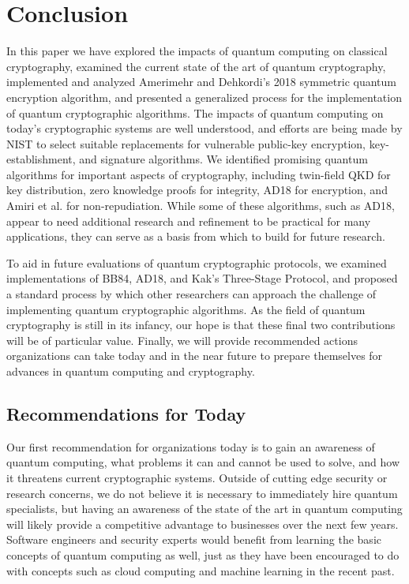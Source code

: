 \documentclass[sigconf]{acmart}
\begin{document}
\section{Conclusion}
In this paper we have explored the impacts of quantum computing on classical cryptography, examined the current state of the art of quantum cryptography, implemented and analyzed Amerimehr and Dehkordi's 2018 symmetric quantum encryption algorithm\cite{amerimehr_quantum_2018}, and presented a generalized process for the implementation of quantum cryptographic algorithms. The impacts of quantum computing on today's cryptographic systems are well understood, and efforts are being made by NIST to select suitable replacements for vulnerable public-key encryption, key-establishment, and signature algorithms\cite{moody_nist_2020, computer_security_division_post-quantum_2017}. We identified promising quantum algorithms for important aspects of cryptography, including twin-field QKD for key distribution, zero knowledge proofs for integrity, AD18 for encryption, and Amiri et al.\cite{amiri_secure_2016} for non-repudiation. While some of these algorithms, such as AD18, appear to need additional research and refinement to be practical for many applications, they can serve as a basis from which to build for future research.

To aid in future evaluations of quantum cryptographic protocols, we examined implementations of BB84, AD18, and Kak's Three-Stage Protocol, and proposed a standard process by which other researchers can approach the challenge of implementing quantum cryptographic algorithms. As the field of quantum cryptography is still in its infancy, our hope is that these final two contributions will be of particular value. Finally, we will provide recommended actions organizations can take today and in the near future to prepare themselves for advances in quantum computing and cryptography.

\subsection{Recommendations for Today}
Our first recommendation for organizations today is to gain an awareness of quantum computing, what problems it can and cannot be used to solve, and how it threatens current cryptographic systems. Outside of cutting edge security or research concerns, we do not believe it is necessary to immediately hire quantum specialists, but having an awareness of the state of the art in quantum computing will likely provide a competitive advantage to businesses over the next few years. Software engineers and security experts would benefit from learning the basic concepts of quantum computing as well, just as they have been encouraged to do with concepts such as cloud computing and machine learning in the recent past.
\end{document}
